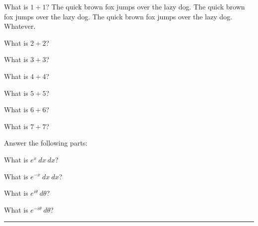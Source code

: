 \documentclass[12pt]{exam}%
\begin{document}
\begin{questions}
\begin{multicols}{2}
\question[5] What is \(1+1\)? The quick brown fox jumps over the lazy dog. The quick brown fox jumps over the lazy dog. The quick brown fox jumps over the lazy dog. Whatever. \answerline%

\question[5] What is \(2+2\)? \answerline%


\question[5] What is \(3+3\)? \answerline%


\question[5] What is \(4+4\)? \answerline%


\question[5] What is \(5+5\)? \answerline%


\question[5] What is \(6+6\)? \answerline%


\question[5] What is \(7+7\)? \answerline%


\question Answer the following parts:

\question[6] What is \(e^{x}\ dx\ dx\)? \answerline%

\question[6] What is \(e^{-x}\ dx\ dx\)? \answerline%

\question[6] What is \(e^{i\theta}\ d\theta\)? \answerline%

\question[6] What is \(e^{-i\theta}\ d\theta\)? \answerline%

\end{multicols}
\end{questions}

\hrule

\begin{center}
\small \cellwidth{1em} \gradetable[h][questions]
\end{center}
\end{document}
